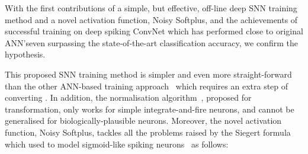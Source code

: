 With the first contributions of a simple, but effective, off-line deep SNN training method and a novel activation function, Noisy Softplus, and the achievements of successful training on \DIFdelbegin {}\DIFdelend \DIFaddbegin {}\DIFaddend deep spiking ConvNet which has performed close to \DIFaddbegin {}\DIFaddend original ANN's\DIFaddbegin \DIFadd{, }\DIFaddend even surpassing the state-of-the-art classification accuracy, we confirm the hypothesis. 

This proposed SNN training method is simpler and even more straight-forward than the other ANN-based training approach~\citep{cao2015spiking,diehl2015fast} which requires an extra step of converting \DIFdelbegin {}\DIFdelend \DIFaddbegin {}\DIFaddend .
In addition, the normalisation algorithm~\citep{diehl2015fast}, proposed for \DIFdelbegin {}\DIFdelend \DIFaddbegin {}\DIFaddend transformation, only works for simple integrate-and-fire neurons, and cannot be generalised for biologically-plausible neurons.
Moreover, the novel activation function, Noisy Softplus, tackles all the problems raised by the Siegert formula which \DIFaddbegin {}\DIFaddend used to model sigmoid-like spiking neurons~\citep{Jug_etal_2012} as follows: 
